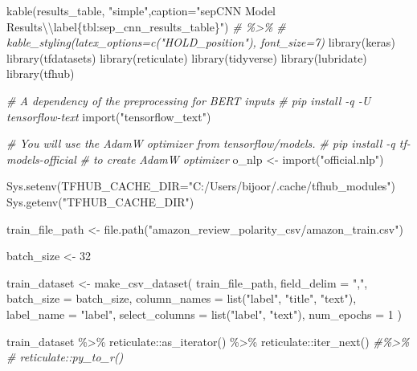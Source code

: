 \documentclass[
]{article}
\newenvironment{Shaded}{}{}
\newcommand{\AttributeTok}[1]{\textcolor[rgb]{0.49,0.56,0.16}{#1}}
\newcommand{\CommentTok}[1]{\textcolor[rgb]{0.38,0.63,0.69}{\textit{#1}}}
\newcommand{\DecValTok}[1]{\textcolor[rgb]{0.25,0.63,0.44}{#1}}
\newcommand{\FunctionTok}[1]{\textcolor[rgb]{0.02,0.16,0.49}{#1}}
\newcommand{\NormalTok}[1]{#1}
\newcommand{\OtherTok}[1]{\textcolor[rgb]{0.00,0.44,0.13}{#1}}
\newcommand{\SpecialCharTok}[1]{\textcolor[rgb]{0.25,0.44,0.63}{#1}}
\newcommand{\StringTok}[1]{\textcolor[rgb]{0.25,0.44,0.63}{#1}}
\begin{document}
\begin{Shaded}
\begin{Highlighting}[]
\FunctionTok{kable}\NormalTok{(results\_table, }\StringTok{"simple"}\NormalTok{,}\AttributeTok{caption=}\StringTok{"sepCNN Model Results}\SpecialCharTok{\textbackslash{}\textbackslash{}}\StringTok{label\{tbl:sep\_cnn\_results\_table\}"}\NormalTok{)}
\CommentTok{\# \%\textgreater{}\%}
\CommentTok{\#     kable\_styling(latex\_options=c("HOLD\_position"), font\_size=7)}
\FunctionTok{library}\NormalTok{(keras)}
\FunctionTok{library}\NormalTok{(tfdatasets)}
\FunctionTok{library}\NormalTok{(reticulate)}
\FunctionTok{library}\NormalTok{(tidyverse)}
\FunctionTok{library}\NormalTok{(lubridate)}
\FunctionTok{library}\NormalTok{(tfhub)}

\CommentTok{\# A dependency of the preprocessing for BERT inputs}
\CommentTok{\# pip install {-}q {-}U tensorflow{-}text}
\FunctionTok{import}\NormalTok{(}\StringTok{"tensorflow\_text"}\NormalTok{)}

\CommentTok{\# You will use the AdamW optimizer from tensorflow/models.}
\CommentTok{\# pip install {-}q tf{-}models{-}official}
\CommentTok{\# to create AdamW optimizer}
\NormalTok{o\_nlp }\OtherTok{\textless{}{-}} \FunctionTok{import}\NormalTok{(}\StringTok{"official.nlp"}\NormalTok{)}

\FunctionTok{Sys.setenv}\NormalTok{(}\AttributeTok{TFHUB\_CACHE\_DIR=}\StringTok{"C:/Users/bijoor/.cache/tfhub\_modules"}\NormalTok{)}
\FunctionTok{Sys.getenv}\NormalTok{(}\StringTok{"TFHUB\_CACHE\_DIR"}\NormalTok{)}

\NormalTok{train\_file\_path }\OtherTok{\textless{}{-}} \FunctionTok{file.path}\NormalTok{(}\StringTok{"amazon\_review\_polarity\_csv/amazon\_train.csv"}\NormalTok{)}

\NormalTok{batch\_size }\OtherTok{\textless{}{-}} \DecValTok{32}

\NormalTok{train\_dataset }\OtherTok{\textless{}{-}} \FunctionTok{make\_csv\_dataset}\NormalTok{(}
\NormalTok{  train\_file\_path, }
  \AttributeTok{field\_delim =} \StringTok{","}\NormalTok{,}
  \AttributeTok{batch\_size =}\NormalTok{ batch\_size,}
  \AttributeTok{column\_names =} \FunctionTok{list}\NormalTok{(}\StringTok{"label"}\NormalTok{, }\StringTok{"title"}\NormalTok{, }\StringTok{"text"}\NormalTok{),}
  \AttributeTok{label\_name =} \StringTok{"label"}\NormalTok{,}
  \AttributeTok{select\_columns =} \FunctionTok{list}\NormalTok{(}\StringTok{"label"}\NormalTok{, }\StringTok{"text"}\NormalTok{),}
  \AttributeTok{num\_epochs =} \DecValTok{1}
\NormalTok{)}


\NormalTok{train\_dataset }\SpecialCharTok{\%\textgreater{}\%}
\NormalTok{  reticulate}\SpecialCharTok{::}\FunctionTok{as\_iterator}\NormalTok{() }\SpecialCharTok{\%\textgreater{}\%} 
\NormalTok{  reticulate}\SpecialCharTok{::}\FunctionTok{iter\_next}\NormalTok{() }\CommentTok{\#\%\textgreater{}\% }
  \CommentTok{\# reticulate::py\_to\_r()}


\end{Highlighting}
\end{Shaded}
\end{document}
